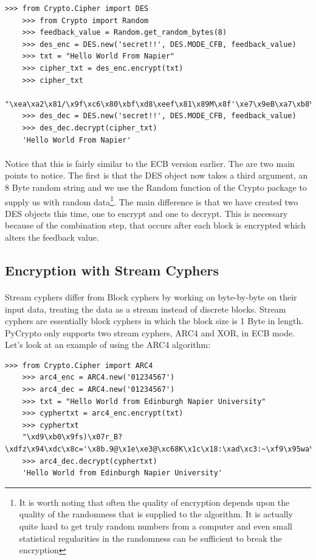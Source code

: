 \documentclass[12pt, a4paper, oneside]{book}
\begin{document}
\begin{lstlisting}[style=DOS]
    >>> from Crypto.Cipher import DES
    >>> from Crypto import Random
    >>> feedback_value = Random.get_random_bytes(8)
    >>> des_enc = DES.new('secret!!', DES.MODE_CFB, feedback_value)
    >>> txt = "Hello World From Napier"
    >>> cipher_txt = des_enc.encrypt(txt)
    >>> cipher_txt
    "\xea\xa2\x81/\x9f\xc6\x80\xbf\xd8\xeef\x81\x89M\x8f'\xe7\x9eB\xa7\xb8\xd7\xd6"
    >>> des_dec = DES.new('secret!!', DES.MODE_CFB, feedback_value)
    >>> des_dec.decrypt(cipher_txt)
    'Hello World From Napier'
\end{lstlisting}


\paragraph{} Notice that this is fairly similar to the ECB version earlier. The are two main points to notice. The first is that the DES object now takes a third argument, an 8 Byte random string and we use the Random function of the Crypto package to supply us with random data\footnote{It is worth noting that often the quality of encryption depends upon the quality of the randomness that is supplied to the algorithm. It is actually quite hard to get truly random numbers from a computer and even small statistical regularities in the randomness can be sufficient to break the encryption}. The main difference is that we have created two DES objects this time, one to encrypt and one to decrypt. This is necessary because of the combination step, that occurs after each block is encrypted which alters the feedback value.

\subsection{Encryption with Stream Cyphers}
\paragraph{} Stream cyphers differ from Block cyphers by working on byte-by-byte on their input data, treating the data as a stream instead of discrete blocks. Stream cyphers are essentially block cyphers in which the block size is 1 Byte in length. PyCrypto only supports two stream cyphers, ARC4 and XOR, in ECB mode. Let's look at an example of using the ARC4 algorithm:

\begin{lstlisting}[style=DOS]
    >>> from Crypto.Cipher import ARC4
    >>> arc4_enc = ARC4.new('01234567')
    >>> arc4_dec = ARC4.new('01234567')
    >>> txt = "Hello World from Edinburgh Napier University"
    >>> cyphertxt = arc4_enc.encrypt(txt)
    >>> cyphertxt
    "\xd9\xb0\x9fs)\x07r_B?\xdfz\x94\xdc\x8c='\x8b.9@\x1e\xe3@\xc68K\x1c\x18:\xad\xc3:~\xf9\x95wa\xbcB\xa0U\x08\xe9"
    >>> arc4_dec.decrypt(cyphertxt)
    'Hello World from Edinburgh Napier University'
\end{lstlisting}
\end{document}
